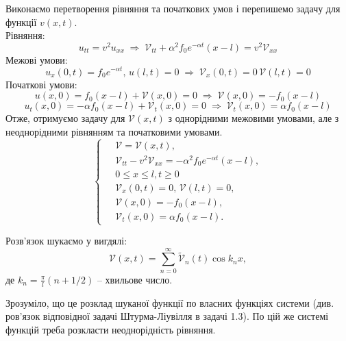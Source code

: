 Виконаємо перетворення рівняння та початкових умов і перепишемо задачу для функції $v(x,t)$.\\
Рівняння:
\begin{equation*}
    u_{tt} = v^2 u_{xx}
    \;\Rightarrow\;
    \mathcal{V}_{tt} + \alpha^2 f_0 e^{-\alpha t} (x-l) = v^2\mathcal{V}_{xx} 
\end{equation*}
Межові умови:
\begin{equation*}
    u_x(0,t) = f_0 e^{-\alpha t}, \, u(l,t) = 0
    \;\Rightarrow\; 
    \mathcal{V}_x(0,t) = 0 \, \mathcal{V}(l,t) = 0
\end{equation*}
Початкові умови:
\begin{equation*}
    u(x,0) = f_0 (x-l) + \mathcal{V}(x,0) = 0
    \;\Rightarrow\;
    \mathcal{V}(x,0) = - f_0 (x-l)
\end{equation*}
\begin{equation*}
    u_t(x,0) = -\alpha f_0 (x-l) + \mathcal{V}_t(x,0) = 0
    \;\Rightarrow\;
    \mathcal{V}_t(x,0) = \alpha f_0  (x-l)
\end{equation*}
Отже, отримуємо задачу для $\mathcal{V}(x,t)$ з однорідними межовими умовами, але з неоднорідними рівнянням та початковими умовами.
\begin{equation} \label{new-cond7,1}
    \left\{ \begin{aligned} %
            \;&\mathcal{V} = \mathcal{V}(x,t), \\
            &\mathcal{V}_{tt} - v^2 \mathcal{V}_{xx} = -\alpha^2 f_0 e^{-\alpha t} (x-l), \\
            &0 \leq x \leq l, t \geq 0 \\
            &\mathcal{V}_x(0,t) = 0, \, \mathcal{V}(l,t) = 0, \\
            &\mathcal{V}(x,0) = - f_0 (x-l),\\
            &\mathcal{V}_t(x,0) = \alpha f_0 (x-l).
    \end{aligned} \right.
\end{equation}

Розв'язок шукаємо у вигдялі:
\begin{equation}
    \mathcal{V}(x,t) = \sum_{n=0}^\infty \widetilde{\mathcal{V}}_n(t) \cos k_n x,
\end{equation}
де $k_n = \frac{\pi}{l}(n + 1/2)$ -- хвильове число.

Зрозуміло, що це розклад шуканої функції по власних функціях системи (див. ров'язок відповідної задачі Штурма-Ліувілля в задачі 1.3). По цій же системі функцій треба розкласти неоднорідність рівняння.

